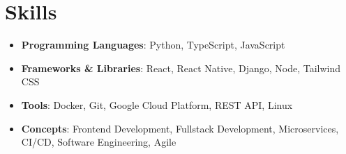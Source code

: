 \documentclass[letterpaper,11pt]{article}
\newcommand{\resumeSubHeadingListStart}{\begin{itemize}[leftmargin=*]}
\newcommand{\resumeSubHeadingListEnd}{\end{itemize}}
\begin{document}
\section{Skills}
    \resumeSubHeadingListStart
        \item{
            \textbf{Programming Languages}{: Python, TypeScript, JavaScript}
        }
        \vspace{-6pt}
        \item{
            \textbf{Frameworks \& Libraries}{: React, React Native, Django, Node, Tailwind CSS}
        }
        \vspace{-6pt}
        \item{
            \textbf{Tools}{: Docker, Git, Google Cloud Platform, REST API, Linux}
        }
        \vspace{-6pt}
        \item{
            \textbf{Concepts}{: Frontend Development, Fullstack Development, Microservices, CI/CD, Software Engineering, Agile}
        }
        \vspace{-6pt}
    \resumeSubHeadingListEnd
\end{document}
